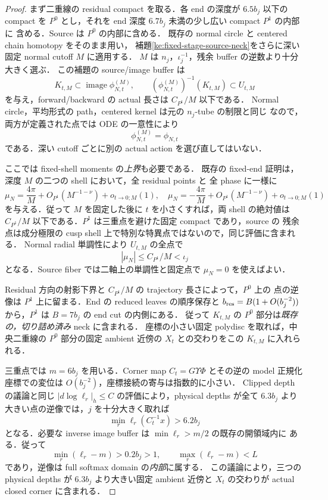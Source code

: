 \begin{proof}
まず二重線の residual compact を取る．各 end の深度が $6.5b_j$ 以下の compact
を $P^0$ とし，それを end 深度 $6.7b_j$ 未満の少し広い compact $P^1$ の内部に
含める．Source は $P^0$ の内部に含める．
既存の normal circle と centered chain homotopy をそのまま用い，
補題\ref{ke:fixed-stage-source-neck}をさらに深い固定 normal cutoff $M$ に適用する．
$M$ は $n_j$，$\iota_j^{-1}$，残余 buffer の逆数より十分大きく選ぶ．
この補題の source/image buffer は
\[
 K_{t,M}\subset\operatorname{image}\phi_{N,t}^{(M)},\qquad
 (\phi_{N,t}^{(M)})^{-1}(K_{t,M})\subset U_{t,M}
\]
を与え，forward/backward の actual 長さは $C_{P^1}/M$ 以下である．
Normal circle，平均形式の path，centered kernel は元の $n_j$-tube の制限と同じ
なので，両方が定義された点では ODE の一意性により
\[
 \phi_{N,t}^{(M)}=\phi_{N,t}
\]
である．深い cutoff ごとに別の actual action を選び直してはいない．

ここでは fixed-shell moments の\emph{上界}も必要である．
既存の fixed-end 証明は，深度 $M$ の二つの shell において，全 residual points と
全 phase に一様に
\[
 \mu_N=\frac{4\pi}{M}+O_{P^1}(M^{-1-\nu})+o_{t\to0;M}(1),
 \quad
 \mu_N=-\frac{4\pi}{M}+O_{P^1}(M^{-1-\nu})+o_{t\to0;M}(1)
\]
を与える．従って $M$ を固定した後に $t$ を小さくすれば，両 shell の絶対値は
$C_{P^1}/M$ 以下である．$P^1$ は三重点を避けた固定 compact であり，source の
残余点は成分極限の cusp shell 上で特別な特異点ではないので，同じ評価に含まれる．
Normal radial 単調性により $U_{t,M}$ の全点で
\[
 |\mu_N|\le C_{P^1}/M<\iota_j
\]
となる．Source fiber では二軸上の単調性と固定点で $\mu_N=0$ を使えばよい．

Residual 方向の射影下界と $C_{P^1}/M$ の trajectory 長さによって，$P^0$ 上の
点の逆像は $P^1$ 上に留まる．End の reduced leaves の順序保存と
$b_{\rm res}=B(1+O(b_j^{-2}))$ から，$P^1$ は $B=7b_j$ の end cut の内側にある．
従って $K_{t,M}$ の $P^0$ 部分は\emph{既存の，切り詰め済み} neck に含まれる．
座標の小さい固定 polydisc を取れば，中央二重線の $P^0$ 部分の固定 ambient
近傍の $X_t$ との交わりをこの $K_{t,M}$ に入れられる．

三重点では $m=6b_j$ を用いる．Corner map $C_t=G\Upsilon\Phi$ とその逆の
model 正規化座標での変位は $O(b_j^{-2})$，座標接続の寄与は指数的に小さい．
Clipped depth の議論と同じ $|d\log\ell_r|_h\le C$ の評価により，physical
depths が全て $6.3b_j$ より大きい点の逆像では，$j$ を十分大きく取れば
\[
 \min_r\ell_r(C_t^{-1}x)>6.2b_j
\]
となる．必要な inverse image buffer は $\min\ell_r>m/2$ の既存の開領域内に
ある．従って
\[
 \min_r(\ell_r-m)>0.2b_j>1,\qquad
 \max_r(\ell_r-m)<L
\]
であり，逆像は full softmax domain の\emph{内部}に属する．
この議論により，三つの physical depths が $6.3b_j$ より大きい固定 ambient
近傍と $X_t$ の交わりが actual closed corner に含まれる．


\end{proof}
